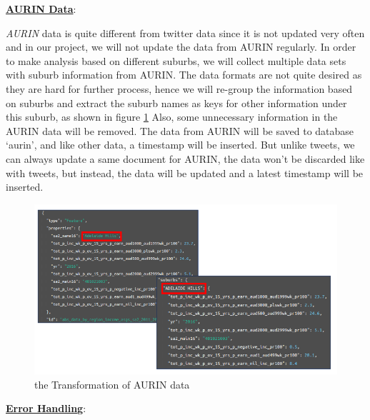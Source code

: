 \documentclass{article}
\begin{document}
\textbf{\underline{AURIN Data}}: 

\textit{AURIN} data is quite different from twitter data since it is not updated very often and in our project, we will not update the data from AURIN regularly. In order to make analysis based on different suburbs, we will collect multiple data sets with suburb information from AURIN. The data formats are not quite desired as they are hard for further process, hence we will re-group the information based on suburbs and extract the suburb names as keys for other information under this suburb, as shown in figure \ref{fig:aurindata} Also, some unnecessary information in the AURIN data will be removed. The data from AURIN will be saved to database ‘aurin’, and like other data, a timestamp will be inserted. But unlike tweets, we can always update a same document for AURIN, the data won’t be discarded like with tweets, but instead, the data will be updated and a latest timestamp will be inserted.
\begin{figure}[htp]
\centering
\includegraphics[width=\textwidth]{img/aurinnew.png}
\caption{the Transformation of AURIN data}
\label{fig:aurindata}
\end{figure}

\textbf{\underline{Error Handling}}: 
\end{document}
